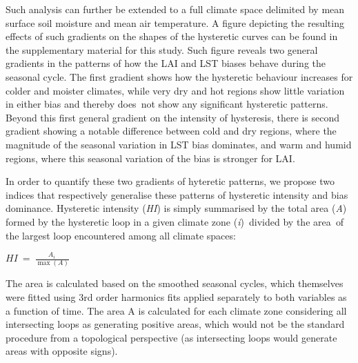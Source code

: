 \documentclass[gmd, manuscript]{copernicus}
\begin{document}
{%
%

Such analysis can further be extended to a full climate space delimited by mean surface soil moisture and mean air temperature. A figure depicting the resulting effects of such gradients on the shapes of the hysteretic curves can be found in the supplementary material for this study. Such figure reveals two general gradients in the
patterns of how the LAI and LST biases behave during the seasonal cycle.
The first gradient shows how the hysteretic behaviour increases for
colder and moister climates, while very dry and hot regions show little
variation in either bias and thereby does~not show any significant
hysteretic patterns. Beyond this first general gradient on the
intensity of hysteresis, there is second gradient showing a notable
difference between cold and dry regions, where the magnitude of the
seasonal variation in LST bias dominates, and warm and humid regions,
where this seasonal variation of the bias is stronger for LAI. 

In order to quantify these two gradients of hyteretic patterns, we propose 
two indices that respectively generalise these patterns of hysteretic intensity and bias
dominance. {{Hysteretic intensity (}}\emph{{HI}}{)} is simply summarised
by the total area (\emph{A}) formed by the hysteretic loop in a given
climate zone (\emph{i})\emph{~}divided by the area\emph{~}of the largest
loop encountered among all climate spaces:

\(HI\ =\ \frac{A_{i\ }}{\max\left(A\right)}\)

The area is calculated based on the smoothed seasonal cycles, which
themselves were fitted using 3rd order harmonics fits applied
separately to both variables as a function of time. The area A is
calculated for each climate zone considering all intersecting loops as
generating positive areas, which would not be the standard procedure
from a topological perspective (as intersecting loops would generate
areas with opposite signs).

}
\end{document}

